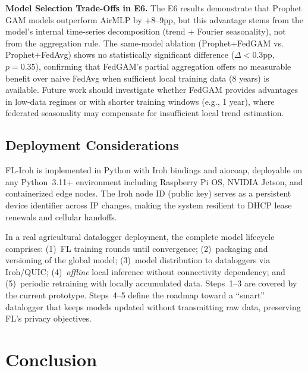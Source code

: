 ﻿\documentclass[journal]{IEEEtran}
\begin{document}
\textbf{Model Selection Trade-Offs in E6.} The E6 results demonstrate that Prophet GAM models outperform AirMLP by +8--9pp, but this advantage stems from the model's internal time-series decomposition (trend + Fourier seasonality), not from the aggregation rule. The same-model ablation (Prophet+FedGAM vs. Prophet+FedAvg) shows no statistically significant difference ($\Delta{<}0.3$pp, $p{=}0.35$), confirming that FedGAM's partial aggregation offers no measurable benefit over naive FedAvg when sufficient local training data (8 years) is available. Future work should investigate whether FedGAM provides advantages in low-data regimes or with shorter training windows (e.g., 1 year), where federated seasonality may compensate for insufficient local trend estimation.

\subsection{Deployment Considerations}

FL-Iroh is implemented in Python with Iroh bindings and aiocoap, deployable on any Python~3.11+ environment including Raspberry Pi OS, NVIDIA Jetson, and containerized edge nodes. The Iroh node ID (public key) serves as a persistent device identifier across IP changes, making the system resilient to DHCP lease renewals and cellular handoffs.

In a real agricultural datalogger deployment, the complete model lifecycle comprises: (1)~FL training rounds until convergence; (2)~packaging and versioning of the global model; (3)~model distribution to dataloggers via Iroh/QUIC; (4)~\emph{offline} local inference without connectivity dependency; and (5)~periodic retraining with locally accumulated data. Steps~1--3 are covered by the current prototype. Steps~4--5 define the roadmap toward a ``smart'' datalogger that keeps models updated without transmitting raw data, preserving FL's privacy objectives.

\section{Conclusion}
\label{sec:conclusion}
\end{document}
